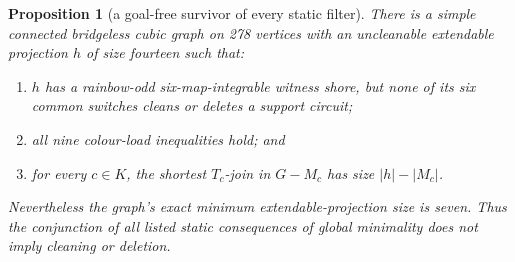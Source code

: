 \documentclass[11pt]{article}
\newtheorem{proposition}[theorem]{Proposition}
\theoremstyle{definition}
\theoremstyle{remark}
\begin{document}
\begin{proposition}[a goal-free survivor of every static filter]
\label{prop:staticfiltersurvivor}
There is a simple connected bridgeless cubic graph on 278 vertices with
an uncleanable extendable projection \(h\) of size fourteen such that:
\begin{enumerate}
  \item \(h\) has a rainbow-odd six-map-integrable witness shore, but
        none of its six common switches cleans or deletes a support
        circuit;
  \item all nine colour-load inequalities hold; and
  \item for every \(c\in K\), the shortest \(T_c\)-join in \(G-M_c\)
        has size \(|h|-|M_c|\).
\end{enumerate}
Nevertheless the graph's exact minimum extendable-projection size is
seven.  Thus the conjunction of all listed static consequences of global
minimality does not imply cleaning or deletion.
\end{proposition}
\end{document}
